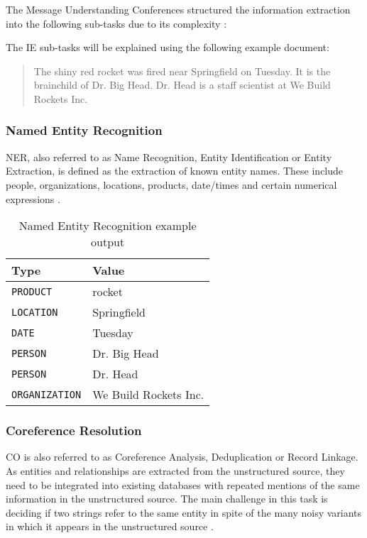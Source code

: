The Message Understanding Conferences structured the information extraction into the following sub-tasks due to its complexity \cite{Carstensen:2010}\cite{Lavelli:2008}:

The \gls{IE} sub-tasks will be explained using the following example document:

\begin{quote}
The shiny red rocket was fired near Springfield on Tuesday. It is the brainchild of Dr. Big Head. Dr. Head is a staff scientist at We Build Rockets Inc.
\cite{Cunningham:2005}
\end{quote}

\subsubsection{Named Entity Recognition}
\gls{NER}, also referred to as Name Recognition, Entity Identification or Entity Extraction, is defined as the extraction of known entity names. These include people, organizations, locations, products, date/times and certain numerical expressions \cite{Linsmayr:2010}. 

\begin{table}[H]
\centering
\begin{tabular*}{\textwidth}{ l  l }
	\toprule
	\textbf{Type} & \textbf{Value} \\
	\midrule
	\texttt{PRODUCT} & rocket \\
	\texttt{LOCATION} & Springfield \\
	\texttt{DATE} & Tuesday \\
	\texttt{PERSON} & Dr. Big Head \\
	\texttt{PERSON} & Dr. Head \\
	\texttt{ORGANIZATION} & We Build Rockets Inc. \\
	\bottomrule
\end{tabular*}
\caption{Named Entity Recognition example output}
\end{table}

\subsubsection{Coreference Resolution}
\gls{CO} is also referred to as Coreference Analysis, Deduplication or Record Linkage. As entities and relationships are extracted from the unstructured source, they need to be integrated into existing databases with repeated mentions of the same information in the unstructured source. The main challenge in this task is deciding if two strings refer to the same entity in spite of the many noisy variants in which it appears in the unstructured source \cite{Sarawagi:2008}.

